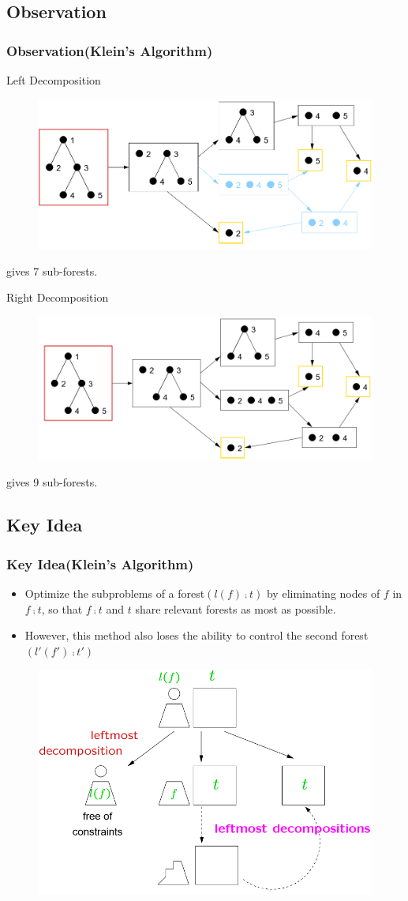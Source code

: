 \documentclass{beamer}
\begin{document}
\subsection{Observation}
\begin{frame}
\frametitle{Observation(Klein's Algorithm)}
Left Decomposition
\begin{figure}
	\includegraphics[width=0.48\linewidth]{leftdecomposition}
	\label{Left Decomposition} 
	\centering
\end{figure}
gives 7 sub-forests.

Right Decomposition
\begin{figure}
	\includegraphics[width=0.48\linewidth]{rightdecomposition}
	\label{right Decomposition} 
	\centering
\end{figure}
gives 9 sub-forests.
\end{frame}

\subsection{Key Idea}
\begin{frame}
\frametitle{Key Idea(Klein's Algorithm)}
\begin{itemize}
\item Optimize the subproblems of a forest$(l(f) \comp t)$ by eliminating nodes of $f$ in $f \comp t$, so that $f \comp t$ and $t$ share relevant forests as most as possible.
\item However, this method also loses the ability to control the second forest$(l'(f') \comp t')$
\end{itemize}
\begin{figure}
	\includegraphics[width=0.6\linewidth]{economicalstrategy}
	\label{Economical Strategy} 
	\centering
\end{figure}
\end{frame}
\end{document}
